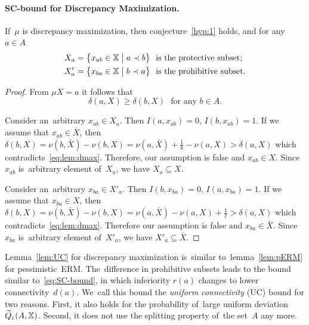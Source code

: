 \documentclass{article}
\def\XX{\mathbb{X}}
\newcommand{\X}{\bar X}
\renewcommand{\geq}{\geqslant}
\newcommand{\wtil}{\widetilde}
\renewcommand{\emph}[1]{\textit{#1}}
\begin{document}
\paragraph{SC-bound for Discrepancy Maximization.}

\begin{lemma}
\label{lem:UC}
    If~$\mu$ is discrepancy maximization, then conjecture~\ref{hyp:1} holds,
    and for any $a\in A$
    \begin{align*}
        X _a &= \bigl\{ x_{ab}\in\XX \bigm| a\prec b\bigr\}
                \text {~ is the protective subset};\\
        X'_a &= \bigl\{ x_{ba}\in\XX \bigm| b \prec a \bigr\}
                \text{~ is the prohibitive subset}.
    \end{align*}
\end{lemma}
\begin{proof}
    From $\mu X=a$ it follows that
    \begin{equation}
    \label{eq:lem:dmax}
        \delta(a,X) \geq \delta(b,X)
        \text{~~for any~} b\in A.
    \end{equation}

    Consider an~arbitrary $x_{ab}\in X_a$.
    Then $I(a,x_{ab})=0$,\; $I(b,x_{ab})=1$.
    If we assume that $x_{ab}\in \X$, then
    $
        \delta(b,X) =
        \nu(b,\X) - \nu(b,X) =
        \nu(a,\X) +\tfrac1k - \nu(a,X) >
        \delta(a,X)
    $
    which contradicts~\eqref{eq:lem:dmax}.
    Therefore, our assumption is false and $x_{ab}\in X$.
    Since $x_{ab}$ is~arbitrary element of~$X_a$, we have $X_a\subseteq X$.

    Consider an~arbitrary $x_{ba}\in X'_a$.
    Then $I(b,x_{ba})=0$,\; $I(a,x_{ba})=1$.
    If we assume that $x_{ba}\in X$, then
    $
        \delta(b,X) =
        \nu(b,\X) - \nu(b,X) =
        \nu(a,\X) - \nu(a,X) +\tfrac1\ell >
        \delta(a,X)
    $
    which contradicts~\eqref{eq:lem:dmax}.
    Therefore our assumption is false and $x_{ba}\in \X$.
    Since $x_{ba}$ is~arbitrary element of~$X'_a$, we have $X'_a\subseteq \X$.
\end{proof}

Lemma~\ref{lem:UC} for discrepancy maximization is~similar
to~lemma~\ref{lem:pERM} for pessimistic~ERM.
The~difference in prohibitive subsets leads to the bound
similar to~\eqref{eq:SC-bound},
in which inferiority $r(a)$ changes to lower connectivity~$d(a)$.
We~call this bound the \emph{uniform connectivity} (UC) bound for two reasons.
First, it also holds for the probability of~large uniform deviation~$\wtil Q_\eps(A,\XX)$.
Second, it does not use the splitting property of~the set~$A$ any more.
\end{document}
